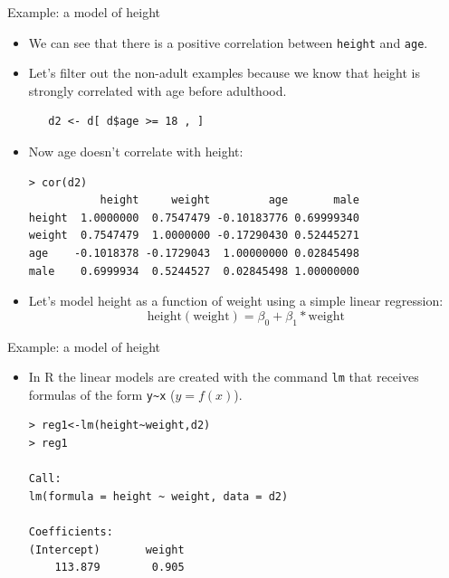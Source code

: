 \documentclass[handout]{beamer}
\begin{document}
\begin{frame}[fragile]{Example: a model of height}
\scriptsize{
\begin{itemize}
 \item We can see that there is a positive correlation between \verb+height+ and \verb+age+.
 
 \item Let's filter out the non-adult examples because we know that height is strongly correlated with age before adulthood. 
 
  \begin{verbatim}
   d2 <- d[ d$age >= 18 , ]
  \end{verbatim}

 \item Now age doesn't correlate with height:
 

  \begin{verbatim}
> cor(d2)
           height     weight         age       male
height  1.0000000  0.7547479 -0.10183776 0.69999340
weight  0.7547479  1.0000000 -0.17290430 0.52445271
age    -0.1018378 -0.1729043  1.00000000 0.02845498
male    0.6999934  0.5244527  0.02845498 1.00000000
  \end{verbatim} 
 
 
 \item Let's model height as a function of weight using a simple linear regression:
 \begin{displaymath}
  \text{height}(\text{weight})=\beta_0+\beta_1*\text{weight}
 \end{displaymath}
 

 
 

 
 


\end{itemize}
 
 
 
} 
\end{frame}

\begin{frame}[fragile]{Example: a model of height}
\scriptsize{



\begin{itemize}

  \item In R the linear models are created with the command \verb+lm+ that receives formulas of the form \verb+y~x+ ($y=f(x)$).

\begin{verbatim}
> reg1<-lm(height~weight,d2)
> reg1

Call:
lm(formula = height ~ weight, data = d2)

Coefficients:
(Intercept)       weight  
    113.879        0.905  
\end{verbatim}



 
 \end{itemize}
 
 


} 
\end{frame}
\end{document}
